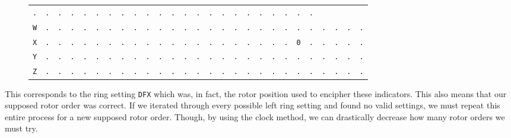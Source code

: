 \begin{figure}[H]
\begin{center}
{\begin{tabular}{c|cccccccccccccccccccccccccc}
				\texttt{.} & \texttt{.} & \texttt{.} & \texttt{.} &
				\texttt{.} & \texttt{.} & \texttt{.} & \texttt{.} &
				\texttt{.} & \texttt{.} & \texttt{.} & \texttt{.} &
				\texttt{.} & \texttt{.} & \texttt{.} & \texttt{.} &
				\texttt{.} & \texttt{.} & \texttt{.} & \texttt{.} &
				\texttt{.} & \texttt{.} & \texttt{.}                             \\
				\texttt{W} & \texttt{.} & \texttt{.} & \texttt{.} &
				\texttt{.} & \texttt{.} & \texttt{.} & \texttt{.} &
				\texttt{.} & \texttt{.} & \texttt{.} & \texttt{.} &
				\texttt{.} & \texttt{.} & \texttt{.} & \texttt{.} &
				\texttt{.} & \texttt{.} & \texttt{.} & \texttt{.} &
				\texttt{.} & \texttt{.} & \texttt{.} & \texttt{.} &
				\texttt{.} & \texttt{.} & \texttt{.}                             \\
				\texttt{X} & \texttt{.} & \texttt{.} & \texttt{.} &
				\texttt{.} & \texttt{.} & \texttt{.} & \texttt{.} &
				\texttt{.} & \texttt{.} & \texttt{.} & \texttt{.} &
				\texttt{.} & \texttt{.} & \texttt{.} & \texttt{.} &
				\texttt{.} & \texttt{.} & \texttt{.} & \texttt{.} &
				\texttt{.} & \texttt{0} & \texttt{.} & \texttt{.} &
				\texttt{.} & \texttt{.} & \texttt{.}                             \\
				\texttt{Y} & \texttt{.} & \texttt{.} & \texttt{.} &
				\texttt{.} & \texttt{.} & \texttt{.} & \texttt{.} &
				\texttt{.} & \texttt{.} & \texttt{.} & \texttt{.} &
				\texttt{.} & \texttt{.} & \texttt{.} & \texttt{.} &
				\texttt{.} & \texttt{.} & \texttt{.} & \texttt{.} &
				\texttt{.} & \texttt{.} & \texttt{.} & \texttt{.} &
				\texttt{.} & \texttt{.} & \texttt{.}                             \\
				\texttt{Z} & \texttt{.} & \texttt{.} & \texttt{.} &
				\texttt{.} & \texttt{.} & \texttt{.} & \texttt{.} &
				\texttt{.} & \texttt{.} & \texttt{.} & \texttt{.} &
				\texttt{.} & \texttt{.} & \texttt{.} & \texttt{.} &
				\texttt{.} & \texttt{.} & \texttt{.} & \texttt{.} &
				\texttt{.} & \texttt{.} & \texttt{.} & \texttt{.} &
				\texttt{.} & \texttt{.} & \texttt{.}                             \\
			\end{tabular}
		}
	\end{center}
\end{figure}
\noindent This corresponds to the ring setting \texttt{DFX} which
was, in fact, the rotor position used to encipher these indicators.
This also means that our supposed rotor order was correct. If we
iterated through every possible left ring setting and found no valid
settings, we must repeat this entire process for a new supposed rotor
order. Though, by using the clock method, we can drastically decrease
how many rotor orders we must try.

